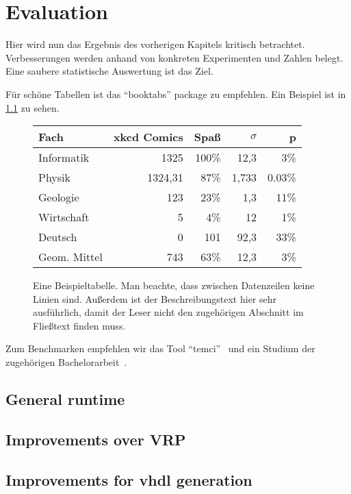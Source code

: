 \chapter{Evaluation}\label{sec:eval}

Hier wird nun das Ergebnis des vorherigen Kapitels kritisch betrachtet.
Verbesserungen werden anhand von konkreten Experimenten und Zahlen belegt.
Eine saubere statistische Auswertung ist das Ziel.

Für schöne Tabellen ist das \enquote{booktabs} package zu empfehlen.
Ein Beispiel ist in \cref{fig:example_table} zu sehen.

\begin{figure}[hb]
\begin{center}
\begin{tabular}{lrrrr}
\toprule
Fach & xkcd Comics & Spaß & $\sigma$ & p \\
\midrule
Informatik & 1325 &  100\% & 12,3 & 3\% \\
Physik     & 1324,31 &  87\%& 1,733 & 0.03\%  \\
Geologie & 123 & 23\% & 1,3 & 11\% \\
Wirtschaft & 5 & 4\% & 12 & 1\% \\
Deutsch & 0 & 101 & 92,3 & 33\% \\
\midrule
Geom. Mittel & 743 & 63\% & 12,3 & 3\% \\
\bottomrule
\end{tabular}
\end{center}
\caption{Eine Beispieltabelle.
Man beachte, dass zwischen Datenzeilen keine Linien sind.
Außerdem ist der Beschreibungstext hier sehr ausführlich,
damit der Leser nicht den zugehörigen Abschnitt im Fließtext finden muss.
}
\label{fig:example_table}
\end{figure}

Zum Benchmarken empfehlen wir das Tool \enquote{temci}~\cite{temci} und ein Studium der zugehörigen Bachelorarbeit~\cite{bechberger16bachelorarbeit}.

\section{General runtime}
\section{Improvements over VRP}
\section{Improvements for vhdl generation}